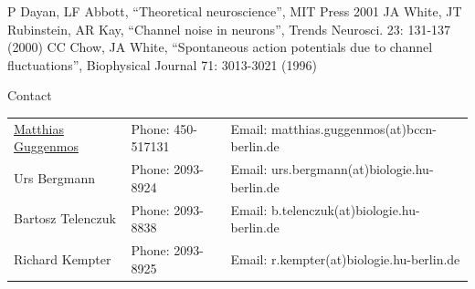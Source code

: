 \documentclass[12pt]{article}
\begin{document}
\begin{thebibliography}{7}
     P Dayan, LF Abbott, ``Theoretical neuroscience'',
        MIT Press 2001
     JA White, JT Rubinstein, AR Kay, ``Channel
        noise in neurons'', Trends Neurosci. 23: 131-137 (2000)
     CC Chow, JA White, ``Spontaneous action
      potentials due to channel fluctuations'', Biophysical Journal
      71: 3013-3021 (1996)
\end{thebibliography}

\vfill
\centerline{\CAP Contact}
\CAP

\begin{tabular}{lll}
\underline{Matthias Guggenmos} & Phone: 450-517131 & Email: matthias.guggenmos(at)bccn-berlin.de \\
Urs Bergmann & Phone: 2093-8924 & Email: urs.bergmann(at)biologie.hu-berlin.de \\
Bartosz Telenczuk & Phone: 2093-8838 & Email: b.telenczuk(at)biologie.hu-berlin.de \\
Richard Kempter & Phone: 2093-8925 & Email: r.kempter(at)biologie.hu-berlin.de \\
\end{tabular}
\end{document}
